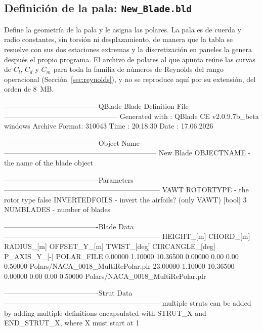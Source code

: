 \subsection*{Definición de la pala: \texttt{New\_Blade.bld}}
\label{sec:anexo_bld}

Define la geometría de la pala y le asigna las polares. La pala
es de cuerda y radio constantes, sin torsión ni desplazamiento, de manera que la tabla se
resuelve con sus dos estaciones extremas y la discretización en paneles la genera después
el propio programa. El archivo de polares al que apunta reúne las curvas de $C_l$, $C_d$ y
$C_m$ para toda la familia de números de Reynolds del rango operacional
(Sección~\ref{sec:reynolds}), y no se reproduce aquí por su extensión, del orden de
$8$~MB.

\begin{cfgcode}
----------------------------------------QBlade Blade Definition File------------------------------------------------
Generated with : QBlade CE v2.0.9.7b_beta windows
Archive Format: 310043
Time : 20:18:30
Date : 17.06.2026

----------------------------------------Object Name-----------------------------------------------------------------
New Blade                                          OBJECTNAME         - the name of the blade object

----------------------------------------Parameters------------------------------------------------------------------
VAWT                                               ROTORTYPE          - the rotor type
false                                              INVERTEDFOILS      - invert the airfoils? (only VAWT) [bool]
3                                                  NUMBLADES          - number of blades

----------------------------------------Blade Data------------------------------------------------------------------
HEIGHT_[m]          CHORD_[m]           RADIUS_[m]          OFFSET_Y_[m]        TWIST_[deg]         CIRCANGLE_[deg]     P_AXIS_Y_[-]        POLAR_FILE          
0.00000             1.10000             10.36500            0.00000             0.00                0.00                0.50000             Polars/NACA_0018_MultiRePolar.plr
23.00000            1.10000             10.36500            0.00000             0.00                0.00                0.50000             Polars/NACA_0018_MultiRePolar.plr

----------------------------------------Strut Data------------------------------------------------------------------
multiple struts can be added by adding multiple definitions encapsulated with STRUT_X and END_STRUT_X, where X must start at 1


\end{cfgcode}
